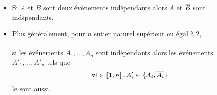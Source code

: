 \begin{defprop}
    \begin{itemize}
        \item Si \(A\) et \(B\) sont deux événements indépendants alors \(A\) et \(\overline{B}\) sont indépendants.
        \item Plus généralement, pour \(n\) entier naturel supérieur ou égal à \(2\),\\~\\
        si les événements \(A_1, \dots , A_n\) sont indépendants alors les événements \( A'_1, \dots , A'_n\) tels que
        \[\forall i \in \left\llbracket1;n\right\rrbracket , A'_i \in \left\lbrace A_i, \overline{A_i}\right\rbrace\]
        le sont aussi.
    \end{itemize}
\end{defprop}